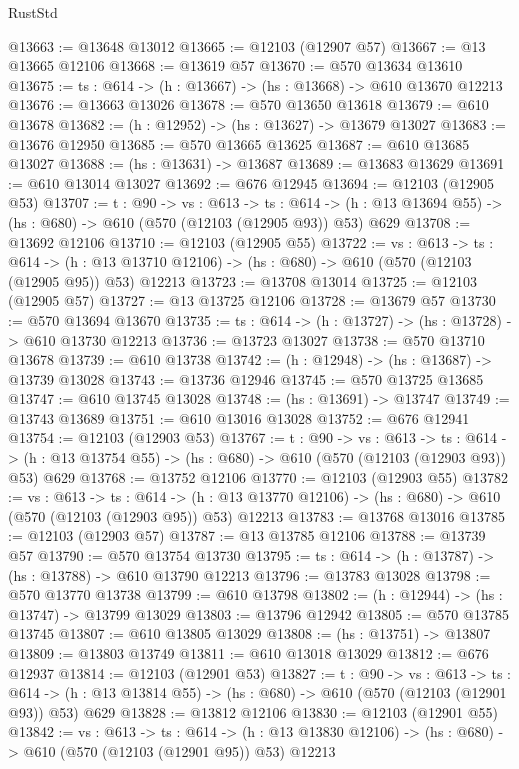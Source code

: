 \begin{lexlean}{RustStd}
\begin{coremodule}
@13663 := @13648 @13012
@13665 := @12103 (@12907 @57)
@13667 := @13 @13665 @12106
@13668 := @13619 @57
@13670 := @570 @13634 @13610
@13675 := {ts : @614} -> (h : @13667) -> (hs : @13668) -> @610 @13670 @12213
@13676 := @13663 @13026
@13678 := @570 @13650 @13618
@13679 := @610 @13678
@13682 := (h : @12952) -> (hs : @13627) -> @13679 @13027
@13683 := @13676 @12950
@13685 := @570 @13665 @13625
@13687 := @610 @13685 @13027
@13688 := (hs : @13631) -> @13687
@13689 := @13683 @13629
@13691 := @610 @13014 @13027
@13692 := @676 @12945
@13694 := @12103 (@12905 @53)
@13707 := {t : @90} ->
  {vs : @613} ->
  {ts : @614} -> (h : @13 @13694 @55) -> (hs : @680) -> @610 (@570 (@12103 (@12905 @93)) @53) @629
@13708 := @13692 @12106
@13710 := @12103 (@12905 @55)
@13722 := {vs : @613} ->
  {ts : @614} ->
  (h : @13 @13710 @12106) -> (hs : @680) -> @610 (@570 (@12103 (@12905 @95)) @53) @12213
@13723 := @13708 @13014
@13725 := @12103 (@12905 @57)
@13727 := @13 @13725 @12106
@13728 := @13679 @57
@13730 := @570 @13694 @13670
@13735 := {ts : @614} -> (h : @13727) -> (hs : @13728) -> @610 @13730 @12213
@13736 := @13723 @13027
@13738 := @570 @13710 @13678
@13739 := @610 @13738
@13742 := (h : @12948) -> (hs : @13687) -> @13739 @13028
@13743 := @13736 @12946
@13745 := @570 @13725 @13685
@13747 := @610 @13745 @13028
@13748 := (hs : @13691) -> @13747
@13749 := @13743 @13689
@13751 := @610 @13016 @13028
@13752 := @676 @12941
@13754 := @12103 (@12903 @53)
@13767 := {t : @90} ->
  {vs : @613} ->
  {ts : @614} -> (h : @13 @13754 @55) -> (hs : @680) -> @610 (@570 (@12103 (@12903 @93)) @53) @629
@13768 := @13752 @12106
@13770 := @12103 (@12903 @55)
@13782 := {vs : @613} ->
  {ts : @614} ->
  (h : @13 @13770 @12106) -> (hs : @680) -> @610 (@570 (@12103 (@12903 @95)) @53) @12213
@13783 := @13768 @13016
@13785 := @12103 (@12903 @57)
@13787 := @13 @13785 @12106
@13788 := @13739 @57
@13790 := @570 @13754 @13730
@13795 := {ts : @614} -> (h : @13787) -> (hs : @13788) -> @610 @13790 @12213
@13796 := @13783 @13028
@13798 := @570 @13770 @13738
@13799 := @610 @13798
@13802 := (h : @12944) -> (hs : @13747) -> @13799 @13029
@13803 := @13796 @12942
@13805 := @570 @13785 @13745
@13807 := @610 @13805 @13029
@13808 := (hs : @13751) -> @13807
@13809 := @13803 @13749
@13811 := @610 @13018 @13029
@13812 := @676 @12937
@13814 := @12103 (@12901 @53)
@13827 := {t : @90} ->
  {vs : @613} ->
  {ts : @614} -> (h : @13 @13814 @55) -> (hs : @680) -> @610 (@570 (@12103 (@12901 @93)) @53) @629
@13828 := @13812 @12106
@13830 := @12103 (@12901 @55)
@13842 := {vs : @613} ->
  {ts : @614} ->
  (h : @13 @13830 @12106) -> (hs : @680) -> @610 (@570 (@12103 (@12901 @95)) @53) @12213

\end{coremodule}
\end{lexlean}
